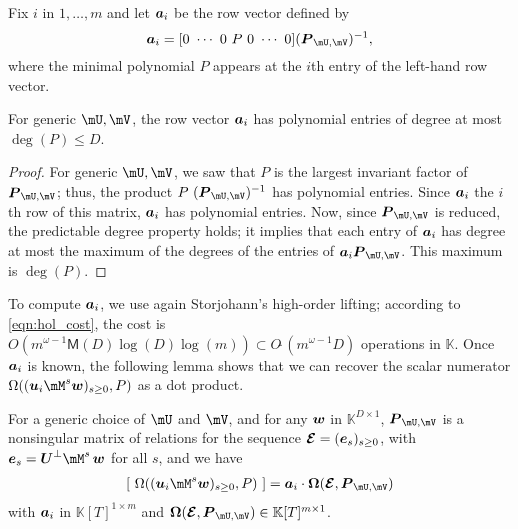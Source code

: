 \documentclass[12pt]{article}
\newcommand{\var}{T} %
\newcommand{\mat}[1]{\bm{\MakeUppercase{#1}}} %
\newcommand{\row}[1]{\bm{\MakeLowercase{#1}}} %
\newcommand{\col}[1]{\bm{\MakeLowercase{#1}}} %
\newcommand{\softO}[1]{O{\tilde{~}}(#1)} %
\newcommand{\minpoly}{P}
\def\M {\ensuremath{\mathsf{M}}}
\def\K{\mathbb{K}}
\def\K {\ensuremath{\mathbb{K}}}
\begin{document}
Fix $i$ in $1,\dots,m$ and let $\row{a}_i$ be the row vector defined
by $$\row{a}_i =[0~\cdots~0~\minpoly~0~\cdots~0]  (\mat{P}_{\mU,\mV})^{-1} ,$$
where the minimal polynomial $\minpoly$ appears at the $i$th entry  of the
left-hand row vector. 
\begin{lemma}\label{utilde}
  For generic $\mU,\mV$, the row vector $\row{a}_i$ has polynomial
  entries of degree at most~$\deg(P) \le D$.
\end{lemma}
\begin{proof}
  For generic $\mU,\mV$, we saw that $\minpoly$ is the largest invariant factor
  of $ \mat{P}_{\mU,\mV}$; thus, the product $\minpoly\
  (\mat{P}_{\mU,\mV})^{-1}$ has polynomial entries. Since $\row{a}_i$ the $i$th
  row of this matrix, $\row{a}_i$ has polynomial entries.  Now, since
  $\mat{P}_{\mU,\mV}$ is reduced, the predictable degree property
  \cite[Theorem~6.3-13]{Kailath80} holds; it implies that each entry of
  $\row{a}_i$ has degree at most the maximum of the degrees of the entries of
  $\row{a}_i\mat{P}_{\mU,\mV}$. This maximum is $\deg(\minpoly)$.
\end{proof}
To compute $\row{a}_i$, we use again Storjohann's high-order lifting;
according to \cref{eqn:hol_cost}, the cost is $ O(m^{\omega-1} \M(D)
\log(D) \log(m)) \subset \softO{m^{\omega-1}D}$ operations in $\K$.
Once $\row{a}_i$ is known, the following lemma shows that we can
recover the scalar numerator $\Omega((\row{u}_i \mM^s \col{w})_{s \ge
  0}, \minpoly)$ as a dot product.
\begin{lemma}\label{lemma:omegaOmega}
  For a generic choice of $\mU$ and $\mV$, and for any $\col{w}$ in
  $\K^{D \times 1}$, $ \mat{P}_{\mU,\mV}$ is a nonsingular matrix of
  relations for the sequence $\mat{\mathcal{E}} =
  (\col{e}_s)_{s\ge0}$, with $\col{e}_s=\mat{U}^\perp \mM^s\, \col{w}$
  for all $s$, and we have
\begin{align}\label{eq:OmegaOmega}
[~\Omega((\row{u}_i \mM^s \col{w})_{s \ge 0}, \minpoly)~] = \row{a}_i\cdot \mat{\Omega}(\mat{\mathcal{E}}, \mat{P}_{\mU,\mV})
\end{align}
with $\row{a}_i$ in $\K[\var]^{1 \times m}$ and 
$\mat{\Omega}(\mat{\mathcal{E}} , \mat{P}_{\mU,\mV}) \in \K[\var]^{m \times 1}$.
\end{lemma}
\end{document}
